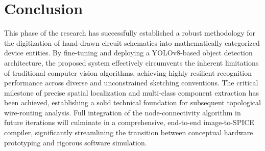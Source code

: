 \chapter*{Conclusion}

This phase of the research has successfully established a robust methodology for the digitization of hand-drawn circuit schematics into mathematically categorized device entities. By fine-tuning and deploying a YOLOv8-based object detection architecture, the proposed system effectively circumvents the inherent limitations of traditional computer vision algorithms, achieving highly resilient recognition performance across diverse and unconstrained sketching conventions. The critical milestone of precise spatial localization and multi-class component extraction has been achieved, establishing a solid technical foundation for subsequent topological wire-routing analysis. Full integration of the node-connectivity algorithm in future iterations will culminate in a comprehensive, end-to-end image-to-SPICE compiler, significantly streamlining the transition between conceptual hardware prototyping and rigorous software simulation.
